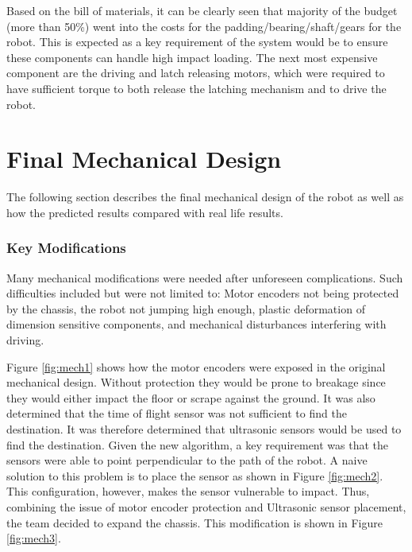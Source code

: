 \documentclass[ece]{uw-wkrpt}
\let\oldsection\section
\renewcommand\section{\clearpage\oldsection}
\begin{document}
Based on the bill of materials, it can be clearly seen that majority of the budget (more than 50\%) went into the costs for the padding/bearing/shaft/gears for the robot. This is expected as a key requirement of the system would be to ensure these components can handle high impact loading. The next most expensive component are the driving and latch releasing motors, which were required to have sufficient torque to both release the latching mechanism and to drive the robot. 

\section{Final Mechanical Design} \label{mech}

The following section describes the final mechanical design of the robot as well as how the predicted results compared with real life results.

\subsubsection{Key Modifications}

Many mechanical modifications were needed after unforeseen complications. Such difficulties included but were not limited to: Motor encoders not being protected by the chassis, the robot not jumping high enough, plastic deformation of dimension sensitive components, and mechanical disturbances interfering with driving.  

Figure \ref{fig:mech1} shows how the motor encoders were exposed in the original mechanical design. Without protection they would be prone to breakage since they would either impact the floor or scrape against the ground. It was also determined that the time of flight sensor was not sufficient to find the destination. It was therefore determined that ultrasonic sensors would be used to find the destination. Given the new algorithm, a key requirement was that the sensors were able to point perpendicular to the path of the robot. A naive solution to this problem is to place the sensor as shown in Figure \ref{fig:mech2}. This configuration, however, makes the sensor vulnerable to impact. Thus, combining the issue of motor encoder protection and Ultrasonic sensor placement, the team decided to expand the chassis. This modification is shown in Figure \ref{fig:mech3}. 
\end{document}
